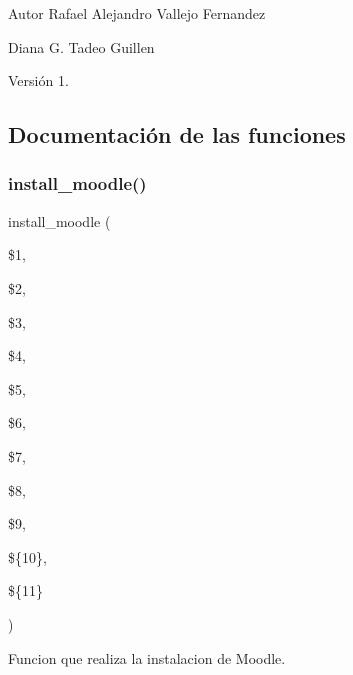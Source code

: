 \begin{DoxyAuthor}{Autor}
Rafael Alejandro Vallejo Fernandez 

Diana G. Tadeo Guillen 
\end{DoxyAuthor}
\begin{DoxyVersion}{Versión}
1. 
\end{DoxyVersion}


\subsection{Documentación de las funciones}
\mbox{\label{Moodle__Instalador__General_8sh_a918304e5f7b510c25d98d774d24a593b}} 
\subsubsection{\texorpdfstring{install\+\_\+moodle()}{install\_moodle()}}
{\footnotesize\ttfamily install\+\_\+moodle (\begin{DoxyParamCaption}\item[{}]{\$1,  }\item[{}]{\$2,  }\item[{}]{\$3,  }\item[{}]{\$4,  }\item[{}]{\$5,  }\item[{}]{\$6,  }\item[{}]{\$7,  }\item[{}]{\$8,  }\item[{}]{\$9,  }\item[{}]{\$\{10\},  }\item[{}]{\$\{11\} }\end{DoxyParamCaption})}



Funcion que realiza la instalacion de Moodle. 


